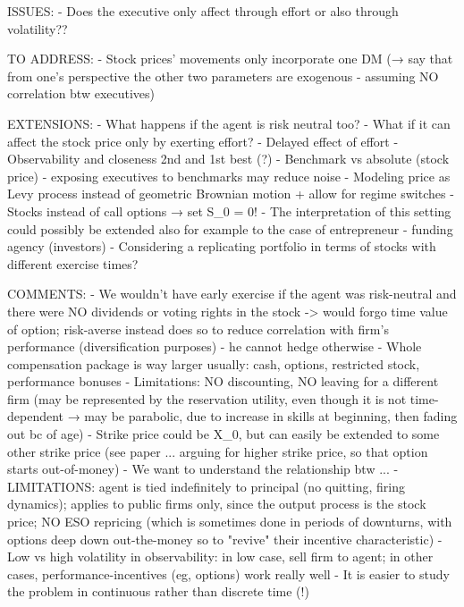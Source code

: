ISSUES:
- Does the executive only affect through effort or also through volatility??






TO ADDRESS:
- Stock prices' movements only incorporate one DM (→ say that from one's perspective the other two parameters are exogenous - assuming NO correlation btw executives) 


EXTENSIONS:
- What happens if the agent is risk neutral too?
- What if it can affect the stock price only by exerting effort?
- Delayed effect of effort
- Observability and closeness 2nd and 1st best (?)
- Benchmark vs absolute (stock price) - exposing executives to benchmarks may reduce noise
- Modeling price as Levy process instead of geometric Brownian motion + allow for regime switches
- Stocks instead of call options → set S_0 = 0!
- The interpretation of this setting could possibly be extended also for example to the case of entrepreneur - funding agency (investors)
- Considering a replicating portfolio in terms of stocks with different exercise times?


COMMENTS:
- We wouldn't have early exercise if the agent was risk-neutral and there were NO dividends or voting rights in the stock -> would forgo time value of option; risk-averse instead does so to reduce correlation with firm's performance (diversification purposes) - he cannot hedge otherwise
- Whole compensation package is way larger usually: cash, options, restricted stock, performance bonuses
- Limitations: NO discounting, NO leaving for a different firm (may be represented by the reservation utility, even though it is not time-dependent → may be parabolic, due to increase in skills at beginning, then fading out bc of age)
- Strike price could be X_0, but can easily be extended to some other strike price (see paper ... arguing for higher strike price, so that option starts out-of-money)
- We want to understand the relationship btw ...
- LIMITATIONS: agent is tied indefinitely to principal (no quitting, firing dynamics); applies to public firms only, since the output process is the stock price; NO ESO repricing (which is sometimes done in periods of downturns, with options deep down out-the-money so to "revive" their incentive characteristic)
- Low vs high volatility in observability: in low case, sell firm to agent; in other cases, performance-incentives (eg, options) work really well
- It is easier to study the problem in continuous rather than discrete time (!)